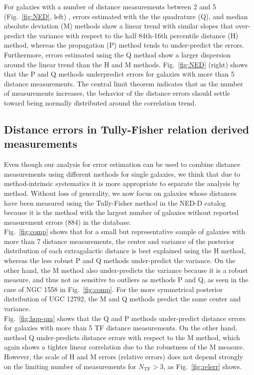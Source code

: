 \documentclass[a4paper,fleqn,usenatbib]{mnras}
\begin{document}
For galaxies with a number of distance measurements between 2 and 5 (Fig.~\ref{fig:NED}, left) , errors estimated with the the quadrature (Q), and median absolute deviation (M) methods show a linear trend with similar slopes that over-predict the variance with respect to the half 84th-16th percentile distance (H) method, whereas the propagation (P) method tends to under-predict the errors. Furthermore, errors estimated using the Q method show a larger dispersion around the linear trend than the H and M methods. Fig.~\ref{fig:NED} (right) shows that the P and Q methods underpredict errors for galaxies with more than 5 distance measurements. The central limit theorem indicates that as the number of measurements increases, the behavior of the distance errors should settle toward being normally distributed around the correlation trend. 

\subsection{Distance errors in Tully-Fisher relation derived measurements}

Even though our analysis for error estimation can be used to combine distance measurements using different methods for single galaxies, we think that due to method-intrinsic systematics it is more appropriate to separate the analysis by method. Without loss of generality, we now focus on galaxies whose distances have been measured using the Tully-Fisher method in the NED-D catalog because it is the method with the largest number of galaxies without reported measurement errors (884) in the database.  \\

Fig.~\ref{fig:comp} shows that for a small but representative sample of galaxies with more than 7 distance measurements, the center and variance of the posterior distribution of each extragalactic distance is best explained using the H method, whereas the less robust P and Q methods under-predict the variance. On the other hand, the M method also under-predicts the variance because it is a robust measure, and thus not as sensitive to outliers as methods P and Q, as seen in the case of NGC 1558 in Fig.~\ref{fig:comp}. For the more symmetrical posterior distribution of UGC 12792, the M and Q methods predict the same center and variance.\\

Fig.~\ref{fig:hqp-qm} shows that the Q and P methods under-predict distance errors for galaxies with more than 5 TF distance measurements. On the other hand, method Q under-predicts distance errors with respect to the M method, which again shows a tighter linear correlation due to the robustness of the M measure. However, the scale of H and M errors (relative errors) does not depend strongly on the limiting number of measurements for $N_\mathrm{TF}>3$, as Fig.~\ref{fig:relerr} shows. \\
\end{document}
